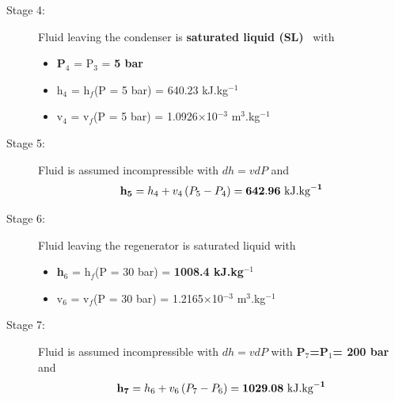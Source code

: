 \documentclass[calculator,steamtables,refrigeranttables,psychrometricchart,datasheet,resit]{exam}
\begin{document}
\begin{question}
\begin{enumerate}[(a)]
{\begin{description}
\item[Stage 4:] Fluid leaving the condenser is {\bf saturated liquid (SL)}~ with
\begin{itemize}
\item {\bf P$_{4}$} = P$_{3}$ = {\bf 5 bar}~
\item h$_{4}$ = h$_{f}$(P = 5 bar) =  640.23 kJ.kg$^{-1}$
\item v$_{4}$ = v$_{f}$(P = 5 bar) = 1.0926$\times$10$^{-3}$ m$^{3}$.kg$^{-1}$
\end{itemize}

\item[Stage 5:] Fluid is assumed incompressible with $dh = vdP$ and~
\begin{displaymath}
{\bf h_{5}} = h_{4} + v_{4}\left(P_{5}-P_{4}\right) = {\bf 642.96 \text{ kJ.kg}^{-1}}
\end{displaymath}

\item[Stage 6:]  Fluid leaving the regenerator is saturated liquid with
\begin{itemize}
\item {\bf h$_{6}$} = h$_{f}$(P = 30 bar) =  {\bf 1008.4 kJ.kg$^{-1}$}~
\item v$_{6}$ = v$_{f}$(P = 30 bar) = 1.2165$\times$10$^{-3}$ m$^{3}$.kg$^{-1}$
\end{itemize}


\item[Stage 7:]  Fluid is assumed incompressible with $dh = vdP$ with {\bf P$_{7}$=P$_{1}$= 200 bar}~ and
\begin{displaymath}
{\bf h_{7}} = h_{6} + v_{6}\left(P_{7}-P_{6}\right) = {\bf 1029.08 \text{ kJ.kg}^{-1}}
\end{displaymath}~
\end{description}

}
\end{enumerate}
\end{question}
\end{document}
